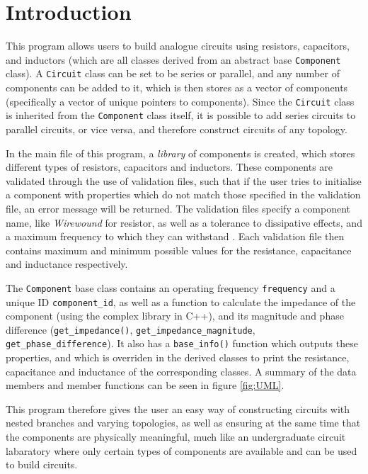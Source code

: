 \documentclass[11pt, letterpaper]{article}
\begin{document}
\newpage
\vspace{5pt}
\tableofcontents

\newpage
\vspace{5pt}

\section{Introduction}
This program allows users to build analogue circuits using resistors, capacitors, and inductors (which are all classes derived from an abstract  base \verb|Component| class). A \verb|Circuit| class can be set to be series or parallel, and any number of components can be added to it, which is then stores as a vector of components (specifically a vector of unique pointers to components). Since the \verb|Circuit| class is inherited from the \verb|Component| class itself, it is possible to add series circuits to parallel circuits, or vice versa, and therefore construct circuits of any topology.

In the main file of this program, a \textit{library} of components is created, which stores different types of resistors, capacitors and inductors. These components are validated through the use of validation files, such that if the user tries to initialise a component with properties which do not match those specified in the validation file, an error message will be returned. The validation files specify a component name, like \textit{Wirewound} for resistor, as well as a tolerance to dissipative effects, and a maximum frequency to which they can withstand \cite{eepower_resistormaterials}. Each validation file then contains maximum and minimum possible values for the resistance, capacitance and inductance respectively. 

The \verb|Component| base class contains an operating frequency \verb|frequency| and a unique ID \verb|component_id|, as well as a function to calculate the impedance of the component (using the complex library in C++), and its magnitude and phase difference (\verb|get_impedance()|, \verb|get_impedance_magnitude|, \verb|get_phase_difference|). It also has a \verb|base_info()| function which outputs these properties, and which is overriden in the derived classes to print the resistance, capacitance and inductance of the corresponding classes. A summary of the data members and member functions can be seen in figure \ref{fig:UML}.

This program therefore gives the user an easy way of constructing circuits with nested branches and varying topologies, as well as ensuring at the same time that the components are physically meaningful, much like an undergraduate circuit labaratory where only certain types of components are available and can be used to build circuits.
\end{document}
